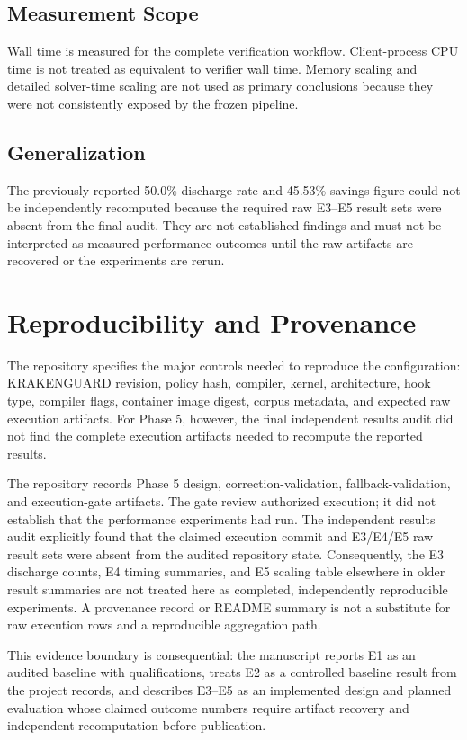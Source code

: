 \documentclass[12pt,a4paper]{article}
\begin{document}
\subsection{Measurement Scope}
Wall time is measured for the complete verification workflow. Client-process CPU time is not treated as equivalent to verifier wall time. Memory scaling and detailed solver-time scaling are not used as primary conclusions because they were not consistently exposed by the frozen pipeline.

\subsection{Generalization}
The previously reported 50.0\% discharge rate and 45.53\% savings figure could not be independently recomputed because the required raw E3--E5 result sets were absent from the final audit. They are not established findings and must not be interpreted as measured performance outcomes until the raw artifacts are recovered or the experiments are rerun.

\section{Reproducibility and Provenance}

The repository specifies the major controls needed to reproduce the configuration: KRAKENGUARD revision, policy hash, compiler, kernel, architecture, hook type, compiler flags, container image digest, corpus metadata, and expected raw execution artifacts. For Phase 5, however, the final independent results audit did not find the complete execution artifacts needed to recompute the reported results.

The repository records Phase 5 design, correction-validation, fallback-validation, and execution-gate artifacts. The gate review authorized execution; it did not establish that the performance experiments had run. The independent results audit explicitly found that the claimed execution commit and E3/E4/E5 raw result sets were absent from the audited repository state. Consequently, the E3 discharge counts, E4 timing summaries, and E5 scaling table elsewhere in older result summaries are not treated here as completed, independently reproducible experiments. A provenance record or README summary is not a substitute for raw execution rows and a reproducible aggregation path.

This evidence boundary is consequential: the manuscript reports E1 as an audited baseline with qualifications, treats E2 as a controlled baseline result from the project records, and describes E3--E5 as an implemented design and planned evaluation whose claimed outcome numbers require artifact recovery and independent recomputation before publication.
\end{document}
